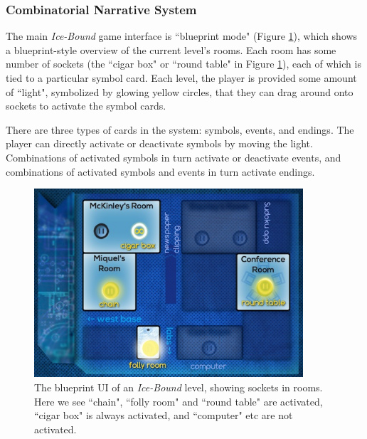 
\subsubsection{Combinatorial Narrative System}\label{subsubsec:combinatorial-narrative-system}

The main \textit{Ice-Bound} game interface is ``blueprint mode" (Figure \ref{fig:blueprint}), which shows a blueprint-style overview of the current level's rooms. Each room has some number of sockets (the ``cigar box" or ``round table" in Figure \ref{fig:blueprint}), each of which is tied to a particular symbol card. Each level, the player is provided some amount of ``light", symbolized by glowing yellow circles, that they can drag around onto sockets to activate the symbol cards.

There are three types of cards in the system: symbols, events, and endings. The player can directly activate or deactivate symbols by moving the light. Combinations of activated symbols in turn activate or deactivate events, and combinations of activated symbols and events in turn activate endings.


\begin{figure}
    \centering
    \includegraphics[width=10cm]{figures/2-Ice-Bound/blueprint.jpg}
    \caption{The blueprint UI of an \textit{Ice-Bound} level, showing sockets in rooms. Here we see ``chain", ``folly room" and ``round table" are activated, ``cigar box" is always activated, and ``computer" etc are not activated.}
    \label{fig:blueprint}
\end{figure}


